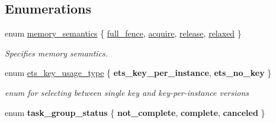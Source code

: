 \subsection*{Enumerations}
\begin{DoxyCompactItemize}
\item 
enum \hyperlink{namespacetbb_adb86d08473679d6fe0eabcdc766ffe3a}{memory\+\_\+semantics} \{ \hyperlink{namespacetbb_adb86d08473679d6fe0eabcdc766ffe3aa6a315190cf4509ec388ecb423432f36a}{full\+\_\+fence}, 
\hyperlink{namespacetbb_adb86d08473679d6fe0eabcdc766ffe3aaa92646b4dc7618530d3a9f51dd10a418}{acquire}, 
\hyperlink{namespacetbb_adb86d08473679d6fe0eabcdc766ffe3aa412563418e657114a102db610f726632}{release}, 
\hyperlink{namespacetbb_adb86d08473679d6fe0eabcdc766ffe3aa73cb2e2bcb94442b8b2b72e93a76f2e5}{relaxed}
 \}\begin{DoxyCompactList}\small\item\em Specifies memory semantics. \end{DoxyCompactList}
\item 
\hypertarget{namespacetbb_ac5bcb6154c8307fa9f97806afddf2288}{}enum \hyperlink{namespacetbb_ac5bcb6154c8307fa9f97806afddf2288}{ets\+\_\+key\+\_\+usage\+\_\+type} \{ {\bfseries ets\+\_\+key\+\_\+per\+\_\+instance}, 
{\bfseries ets\+\_\+no\+\_\+key}
 \}\label{namespacetbb_ac5bcb6154c8307fa9f97806afddf2288}
\begin{DoxyCompactList}\small\item\em enum for selecting between single key and key-\/per-\/instance versions \end{DoxyCompactList}
\item 
\hypertarget{namespacetbb_a4454db821441ca68bad263d82c40fb7a}{}enum {\bfseries task\+\_\+group\+\_\+status} \{ {\bfseries not\+\_\+complete}, 
{\bfseries complete}, 
{\bfseries canceled}
 \}\label{namespacetbb_a4454db821441ca68bad263d82c40fb7a}


\end{DoxyCompactItemize}
